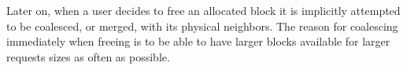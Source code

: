 Later on, when a user decides to free an allocated block it is implicitly attempted to be coalesced, or merged, with its physical neighbors. The reason for coalescing immediately when freeing is to be able to have larger blocks available for larger requests sizes as often as possible.



